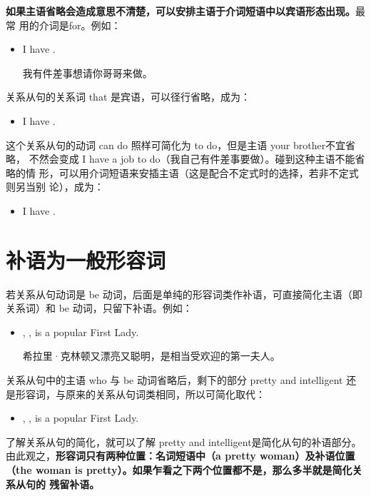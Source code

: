 \textbf{如果主语省略会造成意思不清楚，可以安排主语于介词短语中以宾语形态出现。}最常
用的介词是for。例如：
\begin{itemize}
\item I have  .

  我有件差事想请你哥哥来做。
\end{itemize}
关系从句的关系词 that 是宾语，可以径行省略，成为：
\begin{itemize}
\item I have  .
\end{itemize}
这个关系从句的动词 can do 照样可简化为 to do，但是主语 your brother不宜省略，
不然会变成 I have a job to do（我自己有件差事要做）。碰到这种主语不能省略的情
形，可以用介词短语来安插主语（这是配合不定式时的选择，若非不定式则另当别
论），成为：
\begin{itemize}
\item I have  .
\end{itemize}

\section{补语为一般形容词}

若关系从句动词是 be
动词，后面是单纯的形容词类作补语，可直接简化主语（即关系词）和 be
动词，只留下补语。例如：

\begin{itemize}
\item {}, , is a popular First Lady.

  希拉里·克林顿又漂亮又聪明，是相当受欢迎的第一夫人。
\end{itemize}
关系从句中的主语 who 与 be 动词省略后，剩下的部分 pretty and intelligent
还是形容词，与原来的关系从句词类相同，所以可简化取代：
\begin{itemize}
\item {}, , is a popular First Lady.
\end{itemize}

了解关系从句的简化，就可以了解 pretty and intelligent是简化从句的补语部分。
由此观之，\textbf{形容词只有两种位置：名词短语中（a pretty woman）及补语位置（the
  woman is pretty）。如果乍看之下两个位置都不是，那么多半就是简化关系从句的
  残留补语。}

